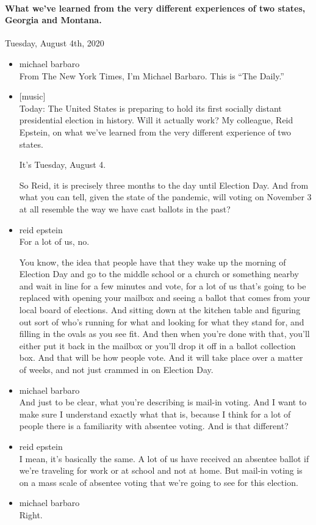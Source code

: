 \hypertarget{what-weve-learned-from-the-very-different-experiences-of-two-states-georgia-and-montana}{%
\paragraph{What we've learned from the very different experiences of two
states, Georgia and
Montana.}\label{what-weve-learned-from-the-very-different-experiences-of-two-states-georgia-and-montana}}

Tuesday, August 4th, 2020

\begin{itemize}
\item
  michael barbaro\\
  From The New York Times, I'm Michael Barbaro. This is ``The Daily.''
\item
  {[}music{]}\\
  Today: The United States is preparing to hold its first socially
  distant presidential election in history. Will it actually work? My
  colleague, Reid Epstein, on what we've learned from the very different
  experience of two states.

  It's Tuesday, August 4.

  So Reid, it is precisely three months to the day until Election Day.
  And from what you can tell, given the state of the pandemic, will
  voting on November 3 at all resemble the way we have cast ballots in
  the past?
\item
  reid epstein\\
  For a lot of us, no.

  You know, the idea that people have that they wake up the morning of
  Election Day and go to the middle school or a church or something
  nearby and wait in line for a few minutes and vote, for a lot of us
  that's going to be replaced with opening your mailbox and seeing a
  ballot that comes from your local board of elections. And sitting down
  at the kitchen table and figuring out sort of who's running for what
  and looking for what they stand for, and filling in the ovals as you
  see fit. And then when you're done with that, you'll either put it
  back in the mailbox or you'll drop it off in a ballot collection box.
  And that will be how people vote. And it will take place over a matter
  of weeks, and not just crammed in on Election Day.
\item
  michael barbaro\\
  And just to be clear, what you're describing is mail-in voting. And I
  want to make sure I understand exactly what that is, because I think
  for a lot of people there is a familiarity with absentee voting. And
  is that different?
\item
  reid epstein\\
  I mean, it's basically the same. A lot of us have received an absentee
  ballot if we're traveling for work or at school and not at home. But
  mail-in voting is on a mass scale of absentee voting that we're going
  to see for this election.
\item
  michael barbaro\\
  Right.


\end{itemize}
